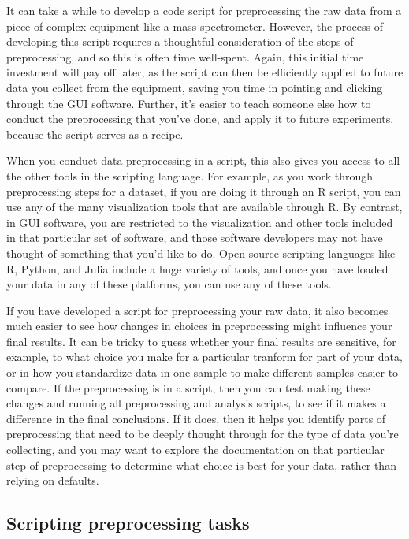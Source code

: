 \documentclass[]{tufte-book}
\begin{document}
It can take a while to develop a code script for preprocessing the raw data from
a piece of complex equipment like a mass spectrometer. However, the process of
developing this script requires a thoughtful consideration of the steps of
preprocessing, and so this is often time well-spent. Again, this initial time
investment will pay off later, as the script can then be efficiently applied to
future data you collect from the equipment, saving you time in pointing and
clicking through the GUI software. Further, it's easier to teach someone else
how to conduct the preprocessing that you've done, and apply it to future
experiments, because the script serves as a recipe.

When you conduct data preprocessing in a script, this also gives you access to
all the other tools in the scripting language. For example, as you work through
preprocessing steps for a dataset, if you are doing it through an R script, you
can use any of the many visualization tools that are available through R. By
contrast, in GUI software, you are restricted to the visualization and other
tools included in that particular set of software, and those software developers
may not have thought of something that you'd like to do. Open-source scripting
languages like R, Python, and Julia include a huge variety of tools, and once
you have loaded your data in any of these platforms, you can use any of these
tools.

If you have developed a script for preprocessing your raw data, it also becomes
much easier to see how changes in choices in preprocessing might influence your
final results. It can be tricky to guess whether your final results are sensitive,
for example, to what choice you make for a particular tranform for part of your
data, or in how you standardize data in one sample to make different samples
easier to compare. If the preprocessing is in a script, then you can test making
these changes and running all preprocessing and analysis scripts, to see if it
makes a difference in the final conclusions. If it does, then it helps you
identify parts of preprocessing that need to be deeply thought through for the
type of data you're collecting, and you may want to explore the documentation on
that particular step of preprocessing to determine what choice is best for your
data, rather than relying on defaults.

\hypertarget{scripting-preprocessing-tasks}{%
\subsection{Scripting preprocessing tasks}\label{scripting-preprocessing-tasks}}
\end{document}
